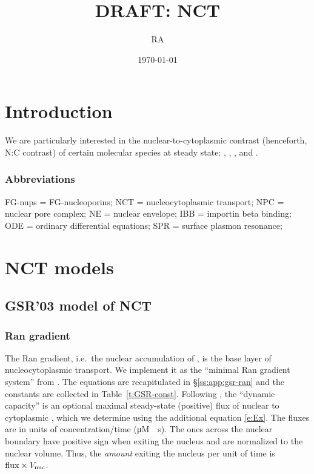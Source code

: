\documentclass[12pt,notitlepage]{article}
\title{DRAFT: NCT}
\author{RA}
\date{\today}
\begin{document}
\maketitle


\section{Introduction}


We are particularly
interested in 
the nuclear-to-cytoplasmic contrast
(henceforth, N:C contrast)
of 
certain molecular species
at steady state:
,
,
,
and
.


\subsubsection*{Abbreviations}

FG-nups = FG-nucleoporins;
NCT = nucleocytoplasmic transport;
NPC = nuclear pore complex;
NE = nuclear envelope;
IBB = importin beta binding; 
ODE = ordinary differential equations;
SPR = surface plasmon resonance;


\section{NCT models}

\subsection{GSR'03 model of NCT} \label{s:GSR03}

\subsubsection*{Ran gradient} \label{s:GSR03:Ran}

The Ran gradient,
i.e.~the nuclear accumulation of ,
is the base layer of nucleocytoplasmic transport.
%
%
We implement it as
the ``minimal Ran gradient system'' from 
\cite{GoerlichSeewaldRibbeck2003}.
%
%
The equations are recapitulated in
\S\ref{ss:app:gsr-ran}
and
the constants are collected in 
Table~\ref{t:GSR-const}.
%
%
Following \cite{GoerlichSeewaldRibbeck2003},
the ``dynamic capacity'' 
is an optional maximal steady-state (positive) flux
of nuclear  to cytoplasmic ,
which we determine using the additional equation \eqref{e:Ex}.
%
%
The fluxes 
are in units of concentration/time (\si{\micro M \per s}).
%
The ones across the nuclear boundary
have positive sign when exiting the nucleus
and are normalized to the nuclear volume.
%
Thus,
the \emph{amount} exiting the nucleus per unit of time is
$\ce{flux} \times V_\text{nuc}$.
\end{document}
